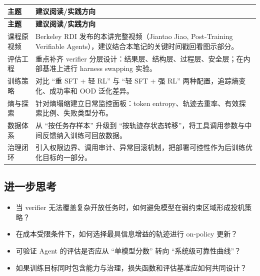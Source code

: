 \begin{longtable}{p{3.0cm}p{8.0cm}}
\toprule
\textbf{主题} & \textbf{建议阅读/实践方向} \\
\midrule
\endfirsthead
\toprule
\textbf{主题} & \textbf{建议阅读/实践方向} \\
\midrule
\endhead
课程原视频 & Berkeley RDI 发布的本讲完整视频（Jiantao Jiao, Post-Training Verifiable Agents），建议结合本笔记的关键时间戳回看图示部分。 \\
评估工程 & 重点补齐 verifier 分层设计：结果层、结构层、过程层、安全层；在内部基准上进行 harness swapping 实验。 \\
训练策略 & 对比 ``重 SFT + 轻 RL'' 与 ``轻 SFT + 强 RL'' 两种配置，追踪熵变化、成功率和 OOD 泛化差异。 \\
熵与探索 & 针对熵塌缩建立日常监控面板：token entropy、轨迹去重率、有效探索比例、失败类型分布。 \\
数据体系 & 从 ``按任务存样本'' 升级到 ``按轨迹存状态转移''，将工具调用参数与中间反馈纳入训练可回放数据。 \\
治理闭环 & 引入权限边界、调用审计、异常回滚机制，把部署可控性作为后训练优化目标的一部分。 \\
\bottomrule
\end{longtable}

\subsection{进一步思考}
\begin{itemize}
    \item 当 verifier 无法覆盖复杂开放任务时，如何避免模型在弱约束区域形成投机策略？
    \item 在成本受限条件下，如何选择最具信息增益的轨迹进行 on-policy 更新？
    \item 可验证 Agent 的评估是否应从 ``单模型分数'' 转向 ``系统级可靠性曲线''？
    \item 如果训练目标同时包含能力与治理，损失函数和评估基准应如何共同设计？
\end{itemize}



